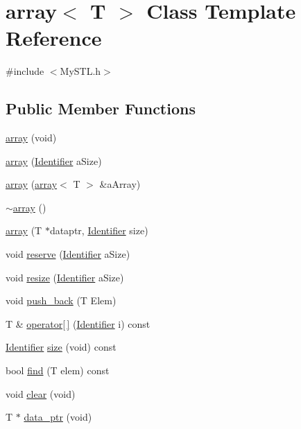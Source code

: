 \section{array$<$ T $>$ Class Template Reference}
\label{classarray}


{\ttfamily \#include $<$MySTL.h$>$}

\subsection*{Public Member Functions}
\begin{DoxyCompactItemize}
\item 
\hyperlink{classarray_a820c25094aa9a4c0062940cb7f77c007}{array} (void)
\item 
\hyperlink{classarray_a093b48b6689a9c485d9916d2f0e892f3}{array} (\hyperlink{Vector3_8h_a25e0b8ddd193bb84ebf6c0eeff6b1c82}{Identifier} aSize)
\item 
\hyperlink{classarray_a59e916c1d1edc5ac1905d2d2efdfed6c}{array} (\hyperlink{classarray}{array}$<$ T $>$ \&aArray)
\item 
\hyperlink{classarray_a9b08050d554bbdf83747443ce4b8b819}{$\sim$array} ()
\item 
\hyperlink{classarray_abbd410f20c8850c8883f36daf76f011e}{array} (T $\ast$dataptr, \hyperlink{Vector3_8h_a25e0b8ddd193bb84ebf6c0eeff6b1c82}{Identifier} size)
\item 
void \hyperlink{classarray_a78ed6d2bf5c7ef2dc5683464f3f7c49e}{reserve} (\hyperlink{Vector3_8h_a25e0b8ddd193bb84ebf6c0eeff6b1c82}{Identifier} aSize)
\item 
void \hyperlink{classarray_af563fcf070f9303dc708442d47c3e2ff}{resize} (\hyperlink{Vector3_8h_a25e0b8ddd193bb84ebf6c0eeff6b1c82}{Identifier} aSize)
\item 
void \hyperlink{classarray_a914bed3e4fa578bbd5f4cb0968190dba}{push\_\-back} (T Elem)
\item 
T \& \hyperlink{classarray_a03d4de353f226903e19a4cb03a0de10e}{operator\mbox{[}$\,$\mbox{]}} (\hyperlink{Vector3_8h_a25e0b8ddd193bb84ebf6c0eeff6b1c82}{Identifier} i) const 
\item 
\hyperlink{Vector3_8h_a25e0b8ddd193bb84ebf6c0eeff6b1c82}{Identifier} \hyperlink{classarray_a7f1f56c3838eeb9bb371c789d8db86dc}{size} (void) const 
\item 
bool \hyperlink{classarray_a2a54cfb298552e30c53121d5a12b8045}{find} (T elem) const 
\item 
void \hyperlink{classarray_a55f66a2540b5f7633cc74b11ee18fb0c}{clear} (void)
\item 
T $\ast$ \hyperlink{classarray_af56fad8278e10237d7bc90651d544e6f}{data\_\-ptr} (void)
\end{DoxyCompactItemize}
